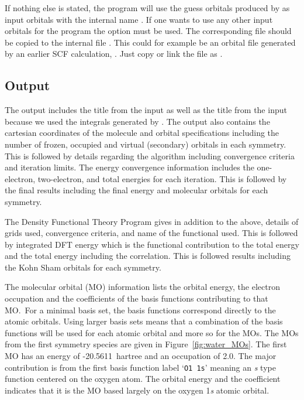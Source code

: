 
If nothing else is stated, the  program will use the guess orbitals
produced by  as input orbitals with the internal name 
. If one wants to use any other input orbitals for the 
 program the option  must be used. The
corresponding file should be copied to the internal file . This
could for example be an orbital file generated by an earlier SCF calculation, 
. Just copy or link the file as .

\subsection{ Output}


The  output includes the title from the input as well as
the title from the  input because we used the integrals
generated by .  The output also contains the cartesian
coordinates of the molecule and orbital specifications including the
number of frozen, occupied and virtual (secondary) orbitals in each
symmetry.  This is followed by details regarding the  
algorithm including convergence criteria and iteration limits.  The 
energy convergence information includes the one-electron, two-electron,
and total energies for each iteration.  This is followed by the final
results including the final energy and molecular orbitals for each
symmetry.

The Density Functional Theory Program gives in addition to the above,
details of grids used, convergence criteria, and name of the functional used. 
This is followed by integrated DFT energy which is the functional contribution 
to the total energy and the total energy including the correlation.
This is followed results including the Kohn Sham orbitals for each symmetry.


The molecular orbital (MO) information lists the orbital energy, the
electron occupation and the coefficients of the basis functions
contributing to that MO.\ For a minimal basis set, the basis functions
correspond directly to the atomic orbitals.  Using larger basis sets
means that a combination of the basis functions will be used for each
atomic orbital and more so for the MOs.
The MOs from the first symmetry species are
given in Figure~\ref{fig:water_MOs}.  The first MO has an energy of 
-20.5611~hartree and an occupation of 2.0.  The major
contribution is from the first basis function label `{\tt O1  1s}'
meaning an {\it s} type function centered on the oxygen atom.  The
orbital
energy and the coefficient indicates that it is the MO based largely
on the oxygen 1{\it s} atomic orbital.  

